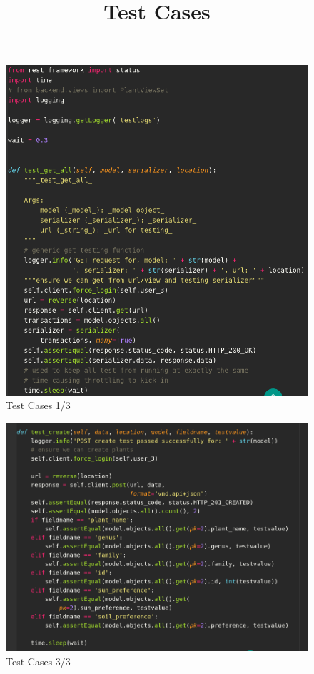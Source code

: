 \documentclass{article}
\begin{document}
     \begin{center}
     \title{Test Cases}
     \begin{figure}[!htb]
         \centering
         \caption{Test Cases 1/3}
         \includegraphics[scale=0.50]{testcase1}
     \end{figure}

      \begin{figure}[!htb]
          \centering
          \caption{Test Cases 3/3}
          \includegraphics[scale=0.50]{testcase3}
      \end{figure}
      

\end{center}
\end{document}
